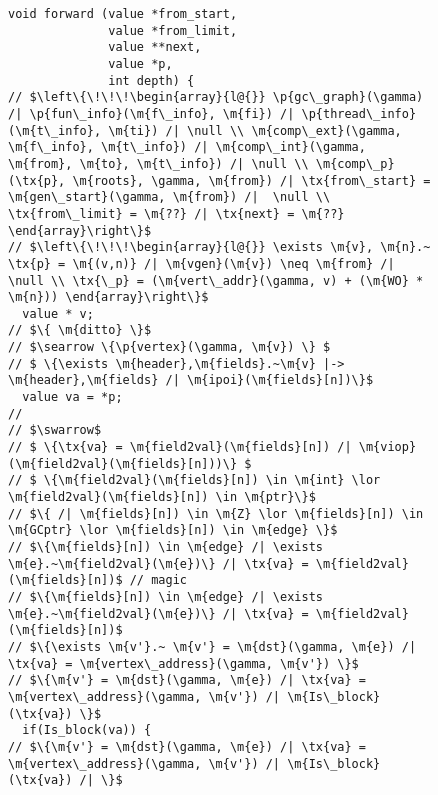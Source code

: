
\begin{figure}[t]
\vspace{-1ex}
  \begin{lstlisting}
void forward (value *from_start,
              value *from_limit,
              value **next,
              value *p,
              int depth) {
// $\left\{\!\!\!\begin{array}{l@{}} \p{gc\_graph}(\gamma) /| \p{fun\_info}(\m{f\_info}, \m{fi}) /| \p{thread\_info}(\m{t\_info}, \m{ti}) /| \null \\ \m{comp\_ext}(\gamma, \m{f\_info}, \m{t\_info}) /| \m{comp\_int}(\gamma, \m{from}, \m{to}, \m{t\_info}) /| \null \\ \m{comp\_p}(\tx{p}, \m{roots}, \gamma, \m{from}) /| \tx{from\_start} = \m{gen\_start}(\gamma, \m{from}) /|  \null \\ \tx{from\_limit} = \m{??} /| \tx{next} = \m{??} \end{array}\right\}$
// $\left\{\!\!\!\begin{array}{l@{}} \exists \m{v}, \m{n}.~ \tx{p} = \m{(v,n)} /| \m{vgen}(\m{v}) \neq \m{from} /| \null \\ \tx{\_p} = (\m{vert\_addr}(\gamma, v) + (\m{WO} * \m{n})) \end{array}\right\}$ 
  value * v;
// $\{ \m{ditto} \}$  
// $\searrow \{\p{vertex}(\gamma, \m{v}) \} $
// $ \{\exists \m{header},\m{fields}.~\m{v} |-> \m{header},\m{fields} /| \m{ipoi}(\m{fields}[n])\}$ 
  value va = *p; 
// 
// $\swarrow$
// $ \{\tx{va} = \m{field2val}(\m{fields}[n]) /| \m{viop}(\m{field2val}(\m{fields}[n]))\} $
// $ \{\m{field2val}(\m{fields}[n]) \in \m{int} \lor \m{field2val}(\m{fields}[n]) \in \m{ptr}\}$
// $\{ /| \m{fields}[n]) \in \m{Z} \lor \m{fields}[n]) \in \m{GCptr} \lor \m{fields}[n]) \in \m{edge} \}$
// $\{\m{fields}[n]) \in \m{edge} /| \exists \m{e}.~\m{field2val}(\m{e})\} /| \tx{va} = \m{field2val}(\m{fields}[n])$ // magic
// $\{\m{fields}[n]) \in \m{edge} /| \exists \m{e}.~\m{field2val}(\m{e})\} /| \tx{va} = \m{field2val}(\m{fields}[n])$ 
// $\{\exists \m{v'}.~ \m{v'} = \m{dst}(\gamma, \m{e}) /| \tx{va} = \m{vertex\_address}(\gamma, \m{v'}) \}$
// $\{\m{v'} = \m{dst}(\gamma, \m{e}) /| \tx{va} = \m{vertex\_address}(\gamma, \m{v'}) /| \m{Is\_block}(\tx{va}) \}$
  if(Is_block(va)) {
// $\{\m{v'} = \m{dst}(\gamma, \m{e}) /| \tx{va} = \m{vertex\_address}(\gamma, \m{v'}) /| \m{Is\_block}(\tx{va}) /| \}$

\end{lstlisting}
\end{figure}
